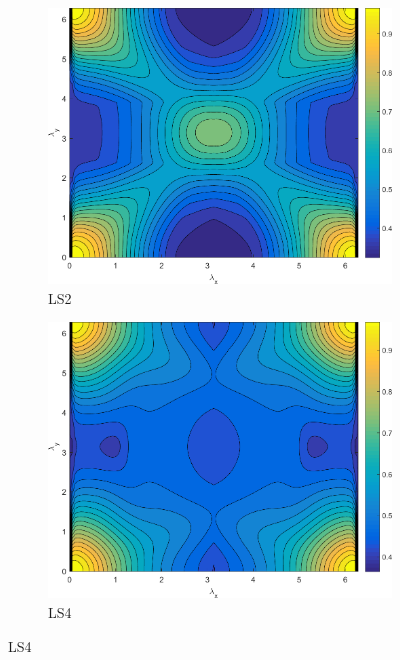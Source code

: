 \begin{figure}
\centering
	{
	\begin{subfigure}[b]{0.485\textwidth}
		\centering
		\includegraphics[width=\textwidth]{figures/sec_DSA/MODPHI_SI_MIP_C=4_UPWLD1_ncells=2_LS2_sigt=10000_c=9999_contour.png}
		\caption{LS2}
	\end{subfigure}
	\hfill
	\begin{subfigure}[b]{0.485\textwidth}
		\centering
		\includegraphics[width=\textwidth]{figures/sec_DSA/MODPHI_SI_MIP_C=4_UPWLD1_ncells=2_LS4_sigt=10000_c=9999_contour.png}
		\caption{LS4}
	\end{subfigure}
}
\end{figure}
